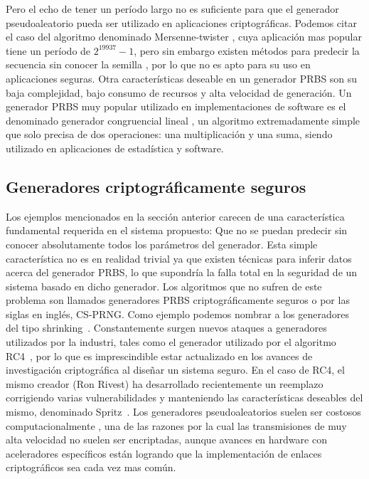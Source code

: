 Pero el echo de tener un período largo no es suficiente para que el generador pseudoaleatorio pueda ser utilizado en aplicaciones criptográficas. Podemos citar el caso del algoritmo denominado Mersenne-twister \cite{matsumoto1998mersenne}, cuya aplicación mas popular tiene un período de $2^{19937}-1$, pero sin embargo existen métodos para predecir la secuencia sin conocer la semilla \cite{argyros2012forgot}, por lo que no es apto para su uso en aplicaciones seguras.
Otra características deseable en un generador PRBS son su baja complejidad, bajo consumo de recursos y alta velocidad de generación. Un generador PRBS muy popular utilizado en implementaciones de software es el denominado generador congruencial lineal \cite{park1988random}, un algoritmo extremadamente simple que solo precisa de dos operaciones: una multiplicación y una suma, siendo utilizado en aplicaciones de estadística y software.

\subsection{Generadores criptográficamente seguros}
\label{cap2:prng}
Los ejemplos mencionados en la sección anterior carecen de una característica fundamental requerida en el sistema propuesto: Que no se puedan predecir sin conocer absolutamente todos los parámetros del generador. Esta simple característica no es en realidad trivial ya que existen técnicas \cite{argyros2012forgot} para inferir datos acerca del generador PRBS, lo que supondría la falla total en la seguridad de un sistema basado en dicho generador. Los algoritmos que no sufren de este problema son llamados generadores PRBS criptográficamente seguros o por las siglas en inglés, CS-PRNG. Como ejemplo podemos nombrar a los generadores del tipo shrinking~\cite{coppersmith1994shrinking}.
Constantemente surgen nuevos ataques a generadores utilizados por la industri, tales como el generador utilizado por el algoritmo RC4~\cite{vaudenay2007passive}, por lo que es imprescindible estar actualizado en los avances de investigación criptográfica al diseñar un sistema seguro. En el caso de RC4, el mismo creador (Ron Rivest) ha desarrollado recientemente un reemplazo corrigiendo varias vulnerabilidades y manteniendo las características deseables del mismo, denominado Spritz~\cite{RS14}. Los generadores pseudoaleatorios suelen ser costosos computacionalmente , una de las razones por la cual las transmisiones de muy alta velocidad no suelen ser encriptadas, aunque avances en hardware con aceleradores específicos \cite{firasta2008intel} están logrando que la implementación de enlaces criptográficos sea cada vez mas común.

